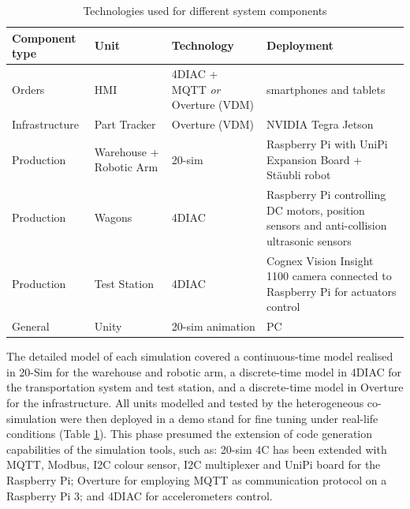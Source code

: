 \begin{table}[ht]
	\centering
		\begin{tabular}{|p{2.4cm}|p{1.8cm}|p{3.2cm}|p{4cm}|}\hline
			\textbf{Component type} & \textbf{Unit} & \textbf{Technology} & \textbf{Deployment}\\
			\hline\hline
			Orders & HMI & 4DIAC + MQTT \textit{or} Overture (VDM) & smartphones and tablets \\ \hline
			Infrastructure & Part Tracker & Overture (VDM) & NVIDIA Tegra Jetson\\ \hline
			Production & Warehouse + Robotic Arm & 20-sim & Raspberry Pi with UniPi Expansion Board + Stäubli robot\\ \hline
			Production & Wagons & 4DIAC & Raspberry Pi controlling DC motors, position sensors and anti-collision ultrasonic sensors \\ \hline
			Production & Test Station & 4DIAC & Cognex Vision Insight 1100 camera connected to Raspberry Pi for actuators control\\ \hline
			General & Unity & 20-sim animation & PC\\\hline
		\end{tabular}
	\caption{Technologies used for different system components}
	\label{tab:iPP4CPPS_technologies}
\end{table}

The detailed model of each simulation covered a continuous-time model realised in 20-Sim for the warehouse and robotic arm, a discrete-time model in 4DIAC for the transportation system and test station, and a discrete-time model in Overture for the infrastructure. All units modelled and tested by the heterogeneous co-simulation were then deployed in a demo stand for fine tuning under real-life conditions (Table \ref{tab:iPP4CPPS_technologies}). This phase presumed the extension of code generation capabilities of the simulation tools, such as: 20-sim 4C has been extended with MQTT, Modbus, I2C colour sensor, I2C multiplexer and UniPi board for the Raspberry Pi; Overture for employing MQTT as communication protocol on a Raspberry Pi 3; and 4DIAC for accelerometers control.

